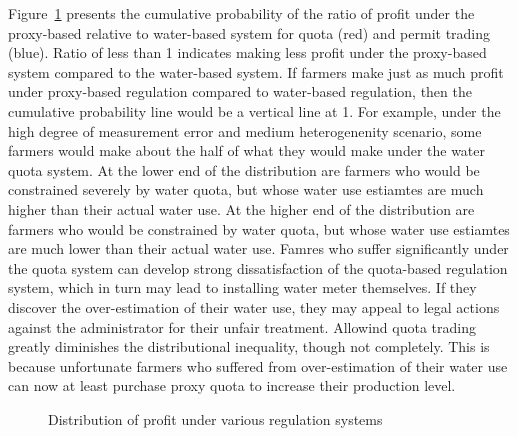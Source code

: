 \documentclass[
  letterpaper,
  DIV=11,
  numbers=noendperiod]{scrartcl}
\begin{document}
Figure~\ref{fig-distributional-equity} presents the cumulative
probability of the ratio of profit under the proxy-based relative to
water-based system for quota (red) and permit trading (blue). Ratio of
less than 1 indicates making less profit under the proxy-based system
compared to the water-based system. If farmers make just as much profit
under proxy-based regulation compared to water-based regulation, then
the cumulative probability line would be a vertical line at 1. For
example, under the high degree of measurement error and medium
heterogenenity scenario, some farmers would make about the half of what
they would make under the water quota system. At the lower end of the
distribution are farmers who would be constrained severely by water
quota, but whose water use estiamtes are much higher than their actual
water use. At the higher end of the distribution are farmers who would
be constrained by water quota, but whose water use estiamtes are much
lower than their actual water use. Famres who suffer significantly under
the quota system can develop strong dissatisfaction of the quota-based
regulation system, which in turn may lead to installing water meter
themselves. If they discover the over-estimation of their water use,
they may appeal to legal actions against the administrator for their
unfair treatment. Allowind quota trading greatly diminishes the
distributional inequality, though not completely. This is because
unfortunate farmers who suffered from over-estimation of their water use
can now at least purchase proxy quota to increase their production
level.

\begin{figure}[H]


\caption{\label{fig-distributional-equity}Distribution of profit under
various regulation systems}

\end{figure}%
\end{document}
